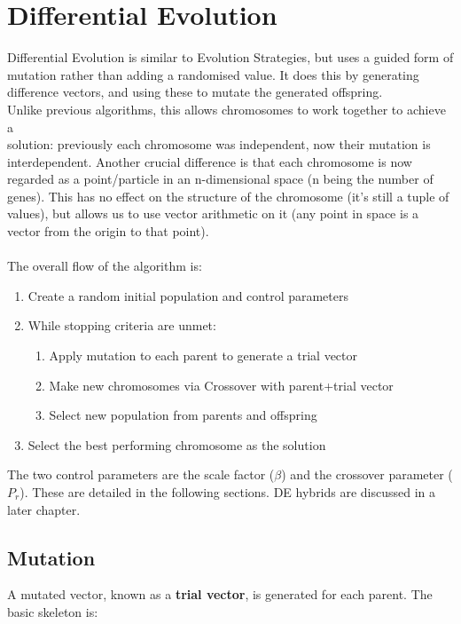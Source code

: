 \section{Differential Evolution}
Differential Evolution is similar to Evolution Strategies, but uses a guided form of mutation rather than adding a randomised value. It does this by generating difference vectors, and using these to mutate the generated offspring.\\
Unlike previous algorithms, this allows chromosomes to work together to achieve a \\solution: previously each chromosome was independent, now their mutation is interdependent. Another crucial difference is that each chromosome is now regarded as a point/particle in an n-dimensional space (n being the number of genes). This has no effect on the structure of the chromosome (it's still a tuple of values), but allows us to use vector arithmetic on it (any point in space is a vector from the origin to that point). \\ \\
The overall flow of the algorithm is: 
\begin{enumerate}[label=\Alph*]
\item Create a random initial population and control parameters
\item While stopping criteria are unmet:
\begin{enumerate}[label=\arabic*]
    \item Apply mutation to each parent to generate a trial vector
    \item Make new chromosomes via Crossover with parent+trial vector
    \item Select new population from parents and offspring
\end{enumerate}
\item Select the best performing chromosome as the solution\\
\end{enumerate}

The two control parameters are the scale factor ($\beta$) and the crossover parameter ($P_r$). These are detailed in the following sections. DE hybrids are discussed in a later chapter. 

\subsection{Mutation}
A mutated vector, known as a \textbf{trial vector}, is generated for each parent. The basic skeleton is:

